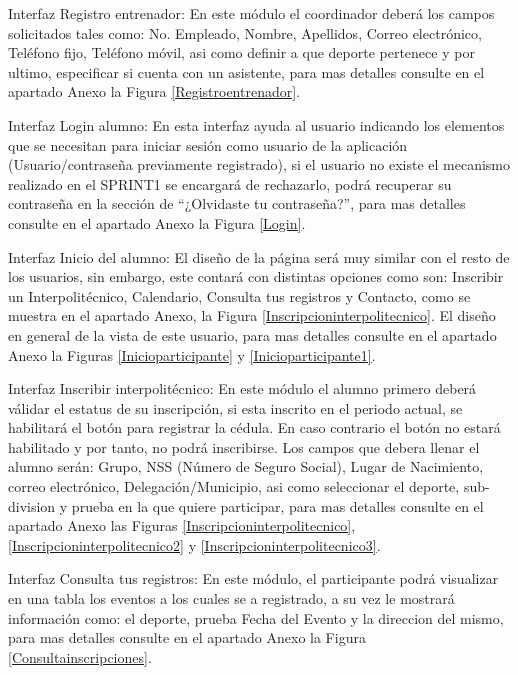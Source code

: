 	\noindent Interfaz Registro entrenador: En este  módulo el coordinador deberá los campos solicitados tales como: No. Empleado, Nombre, Apellidos, Correo electrónico, Teléfono fijo, Teléfono móvil, asi como definir a que deporte pertenece y por ultimo, especificar si cuenta con un asistente, para mas detalles consulte en el apartado Anexo la Figura \ref{Registroentrenador}.
	\newline
	
	\noindent Interfaz Login alumno: En esta interfaz ayuda al usuario indicando los elementos que se necesitan para iniciar sesión como usuario de la aplicación (Usuario/contraseña previamente registrado), si el usuario no existe el mecanismo realizado en el SPRINT1 se encargará de rechazarlo, podrá recuperar su contraseña en la sección de “¿Olvidaste tu contraseña?”, para mas detalles consulte en el apartado Anexo la Figura \ref{Login}.
	\newline
	
	\noindent Interfaz Inicio del alumno: El diseño de la página será muy similar con el resto de los usuarios, sin embargo, este contará con distintas opciones como son: Inscribir un Interpolitécnico, Calendario, Consulta tus registros y Contacto, como se muestra en el apartado Anexo, la Figura 	\ref{Inscripcioninterpolitecnico}. El diseño en general de la vista de este usuario, para mas detalles consulte en el apartado Anexo la Figuras \ref{Inicioparticipante} y \ref{Inicioparticipante1}.
	\newline
	
	\noindent Interfaz Inscribir interpolitécnico: En este módulo el alumno primero deberá válidar el estatus de su inscripción, si esta inscrito en el periodo actual, se habilitará el botón para registrar la cédula. En caso contrario el botón no estará habilitado y por tanto, no podrá inscribirse. Los campos que debera llenar el alumno serán: Grupo, NSS (Número de Seguro Social), Lugar de Nacimiento, correo electrónico, Delegación/Municipio, asi como seleccionar el deporte, sub-division y prueba en la que quiere participar, para mas detalles consulte en el apartado Anexo las Figuras \ref{Inscripcioninterpolitecnico}, \ref{Inscripcioninterpolitecnico2} y \ref{Inscripcioninterpolitecnico3}.
	\newline
	
	\noindent Interfaz Consulta tus registros: En este módulo, el participante podrá visualizar en una tabla los eventos a los cuales se a registrado, a su vez le mostrará información como: el deporte, prueba Fecha del Evento y la direccion del mismo, para mas detalles consulte en el apartado Anexo la Figura \ref{Consultainscripciones}.
	\newline
	
